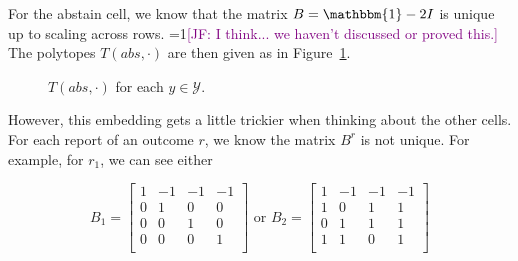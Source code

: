 \documentclass[12pt]{article}
\newcommand{\Comments}{1}
\newcommand{\mynote}[2]{\ifnum\Comments=1\textcolor{#1}{#2}\fi}
\newcommand{\jessie}[1]{\mynote{purple}{[JF: #1]}}
\newcommand{\Y}{\mathcal{Y}}
\newcommand{\ones}{\mathbbm{1}}
\begin{document}
For the abstain cell, we know that the matrix $B = \ones - 2I$ is unique up to scaling across rows. \jessie{I think... we haven't discussed or proved this.}
The polytopes $T(abs, \cdot)$ are then given as in Figure~\ref{fig:abstain-T-report-abs}.
\begin{figure}
\begin{minipage}{0.24\linewidth}
\end{minipage}
\begin{minipage}{0.24\linewidth}
\end{minipage}
\begin{minipage}{0.24\linewidth}
\end{minipage}
\begin{minipage}{0.24\linewidth}
\end{minipage}
\caption{$T(abs, \cdot)$ for each $y \in \Y$.}
\label{fig:abstain-T-report-abs}
\end{figure}

However, this embedding gets a little trickier when thinking about the other cells.
For each report of an outcome $r$, we know the matrix $B^r$ is not unique.
For example, for $r_1$, we can see either

\[ B_1 = \begin{bmatrix}
1 & -1 & -1 & -1 \\
0 & 1 & 0 & 0 \\
0 & 0 & 1 & 0 \\
0 & 0 & 0 & 1 \\
\end{bmatrix} 
% 
\text{ or }
B_2 = 
\begin{bmatrix}
1 & -1 & -1 & -1 \\
1 & 0 & 1 & 1 \\
0 & 1 & 1 & 1 \\
1 & 1 & 0 & 1 \\
\end{bmatrix} 
\]
\end{document}
